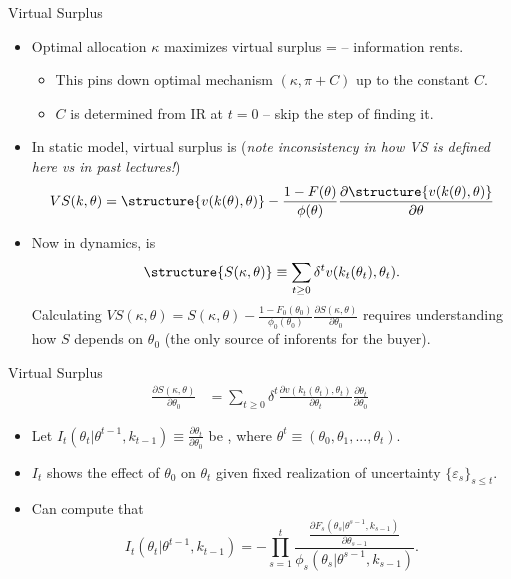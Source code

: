 \documentclass[english,10pt
,aspectratio=169
]{beamer}
\begin{document}
\begin{frame}{Virtual Surplus}
\begin{itemize}
	\item Optimal allocation $\kappa$ maximizes \alert{virtual surplus} =  -- information rents.
	\begin{itemize}
		\item This pins down optimal mechanism $(\kappa,\pi+C)$ up to the constant $C$.
		\item $C$ is determined from IR at $t=0$ -- skip the step of finding it.
	\end{itemize}
	\item In \alert{static} model, \alert{virtual surplus} is (\emph{note inconsistency in how VS is defined here vs in past lectures!})
		$$ VS(k,\theta) = \structure{v(k(\theta),\theta)} - \frac{1-F(\theta)}{\phi(\theta)} \frac{\partial \structure{v(k(\theta),\theta)}}{\partial \theta} $$
	\item Now in \alert{dynamics},  is 
		$$ \structure{S(\kappa,\theta)} \equiv \sum_{t\geq 0} \delta^t v(k_t(\theta_t),\theta_t).$$ 
	Calculating $VS(\kappa,\theta) = S(\kappa,\theta) - \frac{1-F_0(\theta_0)}{\phi_0(\theta_0)} \frac{\partial S(\kappa,\theta)}{\partial \theta_0}$ requires understanding how $S$ depends on $\theta_0$ (the only source of inforents for the buyer).
\end{itemize}
\end{frame}


\begin{frame}{Virtual Surplus}
\begin{align*}
	\frac{\partial S(\kappa,\theta)}{\partial \theta_0} &= \sum_{t\geq 0} \delta^t \frac{\partial v(k_t(\theta_t),\theta_t)}{\partial \theta_t} \frac{\partial \theta_t}{\partial \theta_0}
\end{align*}
\begin{itemize}
	\item Let $I_t(\theta_t | \theta^{t-1}, k_{t-1}) \equiv \frac{\partial \theta_t}{\partial \theta_0}$ be , where $\theta^t \equiv (\theta_0, \theta_1,...,\theta_t)$.
	\item $I_t$ shows the effect of $\theta_0$ on $\theta_t$ given fixed realization of uncertainty $\{\varepsilon_s\}_{s\leq t}$.
	\item Can compute that $$I_t(\theta_t | \theta^{t-1}, k_{t-1}) = -\prod_{s=1}^t \frac{\frac{\partial F_s(\theta_s | \theta^{s-1}, k_{s-1})}{\partial \theta_{s-1}}}{\phi_s(\theta_s | \theta^{s-1}, k_{s-1})}.$$
\end{itemize}
\end{frame}
\end{document}
